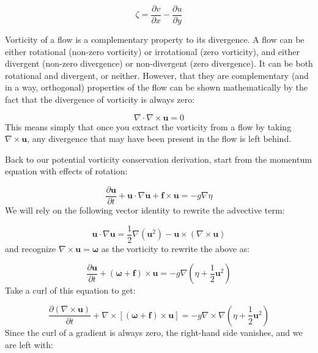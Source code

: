 \documentclass[12pt]{article}
\numberwithin{equation}{section}
\numberwithin{figure}{section}
\numberwithin{table}{section}
\begin{document}
\begin{equation}
  \zeta = \frac{\partial v}{\partial x} - \frac{\partial u}{\partial y}
\end{equation}

Vorticity of a flow is a complementary property to its divergence.
A flow can be either rotational (non-zero vorticity) or irrotational
(zero vorticity), and either divergent (non-zero divergence) or non-divergent
(zero divergence).
It can be both rotational and divergent, or neither.
However, that they are complementary (and in a way, orthogonal) properties of
the flow can be shown mathematically by the fact that the divergence of
vorticity is always zero:

\begin{equation}
  \nabla \cdot \nabla \times \mathbf{u} = 0
\end{equation}
This means simply that once you extract the vorticity from a flow by taking
$\nabla \times \mathbf{u}$, any divergence that may have been present in the
flow is left behind.

Back to our potential vorticity conservation derivation,
start from the momentum equation with effects of rotation:

\begin{equation}
  \frac{\partial \mathbf{u}}{\partial t} +
  \mathbf{u} \cdot \nabla \mathbf{u} +
  \mathbf{f} \times \mathbf{u} =
  - g \nabla \eta
\end{equation}
We will rely on the following vector identity to rewrite the advective term:

\begin{equation}
  \mathbf{u} \cdot \nabla \mathbf{u} =
  \frac{1}{2} \nabla (\mathbf{u}^2) -
  \mathbf{u} \times (\nabla \times \mathbf{u})
\end{equation}
and recognize $\nabla \times \mathbf{u} = \boldsymbol{\omega}$ as the vorticity
to rewrite the above as:

\begin{equation}
  \frac{\partial \mathbf{u}}{\partial t} +
  \left(\boldsymbol{\omega} + \mathbf{f}\right) \times \mathbf{u} =
  - g \nabla \left(\eta + \frac{1}{2} \mathbf{u}^2 \right)
\end{equation}
Take a curl of this equation to get:

\begin{equation}
  \frac{\partial (\nabla \times \mathbf{u})}{\partial t} +
  \nabla \times \left[(\boldsymbol{\omega} + \mathbf{f}) \times \mathbf{u}\right] =
  - g \nabla \times \nabla \left(\eta + \frac{1}{2} \mathbf{u}^2 \right)
\end{equation}
Since the curl of a gradient is always zero, the right-hand side vanishes, and
we are left with:
\end{document}
